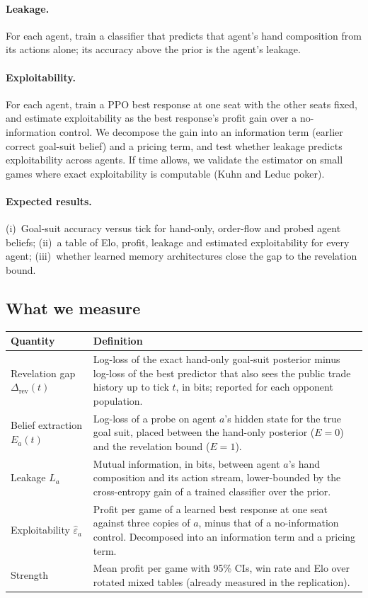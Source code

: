 \documentclass{article}
\begin{document}
\paragraph{Leakage.}
For each agent, train a classifier that predicts that agent's hand composition from its actions alone; its accuracy above the prior is the agent's leakage.

\paragraph{Exploitability.}
For each agent, train a PPO best response at one seat with the other seats fixed, and estimate exploitability as the best response's profit gain over a no-information control.
We decompose the gain into an information term (earlier correct goal-suit belief) and a pricing term, and test whether leakage predicts exploitability across agents.
If time allows, we validate the estimator on small games where exact exploitability is computable (Kuhn and Leduc poker).

\paragraph{Expected results.}
(i)~Goal-suit accuracy versus tick for hand-only, order-flow and probed agent beliefs;
(ii)~a table of Elo, profit, leakage and estimated exploitability for every agent;
(iii)~whether learned memory architectures close the gap to the revelation bound.



\subsection{What we measure}
\begin{tabular}{@{}p{}p{}@{}}
\toprule
Quantity & Definition \\
\midrule
Revelation gap $\Delta_{\text{rev}}(t)$ & Log-loss of the exact hand-only goal-suit posterior minus log-loss of the best predictor that also sees the public trade history up to tick $t$, in bits; reported for each opponent population. \\
Belief extraction $E_a(t)$ & Log-loss of a probe on agent $a$'s hidden state for the true goal suit, placed between the hand-only posterior ($E=0$) and the revelation bound ($E=1$). \\
Leakage $L_a$ & Mutual information, in bits, between agent $a$'s hand composition and its action stream, lower-bounded by the cross-entropy gain of a trained classifier over the prior. \\
Exploitability $\hat\varepsilon_a$ & Profit per game of a learned best response at one seat against three copies of $a$, minus that of a no-information control. Decomposed into an information term and a pricing term. \\
Strength & Mean profit per game with 95\% CIs, win rate and Elo over rotated mixed tables (already measured in the replication). \\
\bottomrule
\end{tabular}
\end{document}
